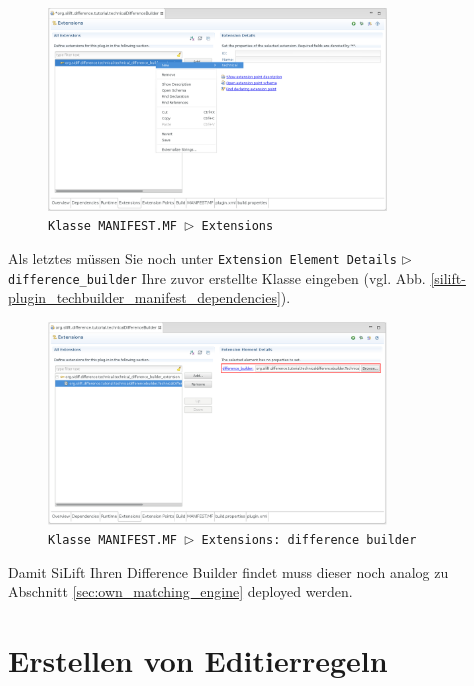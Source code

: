 \documentclass[a4paper]{scrartcl}
\begin{document}
\begin{figure}[H]
\centering
\includegraphics[width=0.8\textwidth]{graphics/silift-plugin_techbuilder_manifest_extension_point.png}
\caption{\texttt{Klasse \texttt{MANIFEST.MF} $\triangleright$  \texttt{Extensions}}}
\label{silift-plugin_techbuilder_manifest_extension_point}
\end{figure}

Als letztes müssen Sie noch unter \texttt{Extension Element Details} $\triangleright$ \texttt{difference\_builder} Ihre zuvor erstellte Klasse eingeben (vgl. Abb. \ref{silift-plugin_techbuilder_manifest_dependencies}).

\begin{figure}[H]
\centering
\includegraphics[width=0.8\textwidth]{graphics/silift-plugin_techbuilder_manifest_extension.png}
\caption{\texttt{Klasse \texttt{MANIFEST.MF} $\triangleright$  \texttt{Extensions}: \texttt{difference builder}}}
\label{silift-plugin_techbuilder_manifest_extension}
\end{figure}

Damit SiLift Ihren Difference Builder findet muss dieser noch analog zu Abschnitt \ref{sec:own_matching_engine} deployed werden.

\section{Erstellen von Editierregeln}
\end{document}
